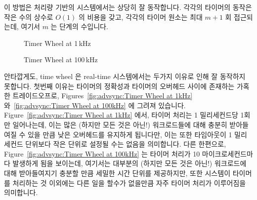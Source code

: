 이 방법은 처리량 기반의 시스템에서는 상당히 잘 동작합니다.
각각의 타이머의 동작은 작은 수의 상수로 $O(1)$ 의 비용을 갖고, 각각의 타이머
원소는 최대 $m+1$ 회 접근되는데, 여기서 $m$ 는 단계의 수입니다.

\begin{figure}[tb]
\centering
{}
\caption{Timer Wheel at 1\,kHz}
\end{figure}

\begin{figure}[tb]
\centering
{}
\caption{Timer Wheel at 100\,kHz}
\end{figure}

안타깝게도, time wheel 은 real-time 시스템에서는 두가지 이유로 인해 잘 동작하지
못합니다.
첫번째 이유는 타이머의 정확성과 타이머의 오버헤드 사이에 존재하는 가혹한 트레이드오프로,
Figures~\ref{fig:advsync:Timer Wheel at 1kHz}
와~\ref{fig:advsync:Timer Wheel at 100kHz}
에 그려져 있습니다.
Figure~\ref{fig:advsync:Timer Wheel at 1kHz} 에서, 타이머 처리는 1 밀리세컨드당
1회만 일어나는데, 이는 많은 (하지만 모든 것은 아닌!) 워크로드들에 대해 충분히
받아들여질 수 있을 만큼 낮은 오버헤드를 유지하게 됩니다만, 이는 또한 타임아웃이
1 밀리세컨드 단위보다 작은 단위로 설정될 수는 없음을 의미합니다.
다른 한편으로,
Figure~\ref{fig:advsync:Timer Wheel at 100kHz}
는 타이머 처리가 10 마이크로세컨드마다 발생하게 됨을 보이는데, 여기서는
대부분의 (하지만 모든 것은 아닌!) 워크로드에 대해 받아들여지기 충분할 만큼
세밀한 시간 단위를 제공하지만, 또한 시스템이 타이머를 처리하는 것 이외에는 다른
일을 할수가 없을만큼 자주 타이머 처리가 이루어짐을 의미합니다.
\iffalse

